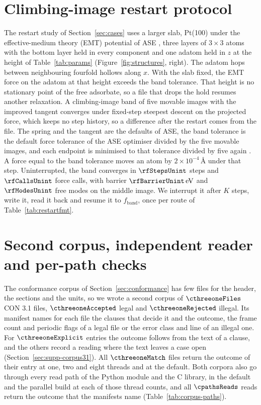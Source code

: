 \section{Climbing-image restart protocol}\label{sec:supp-protocol}
The restart study of Section~\ref{sec:cases}
uses a larger slab, Pt(100) under the effective-medium theory (EMT)
potential of ASE \cite{jacobsenSemiempiricalEffectiveMedium1996}, three
layers of \(3\times3\) atoms with the bottom layer held in every
component and one adatom held in \(z\) at the height of
Table~\ref{tab:params} (Figure~\ref{fig:structures}, right).
The adatom hops between neighbouring fourfold hollows along \(x\).
With the slab fixed, the EMT force on the adatom at that height exceeds
the band tolerance.
That height is no stationary point of the free adsorbate, so a file that
drops the hold resumes another relaxation.
A climbing-image band of five movable images with the improved tangent
\cite{henkelmanClimbingImageNudged2000,henkelmanImprovedTangentEstimate2000}
converges under fixed-step steepest descent on the projected force,
which keeps no step history, so a difference after the restart comes
from the file.
The spring and the tangent are the defaults of ASE, the band tolerance
is the default force tolerance of the ASE optimiser divided by the five
movable images, and each endpoint is minimised to that tolerance divided
by five again \cite{larsenAtomicSimulationEnvironmenta2017}.
A force equal to the band tolerance moves an atom by
\(2\times 10^{-4}\,\text{\AA}\) under that step.
Uninterrupted, the band converges in \(\rfStepsUnint\) steps and
\(\rfCallsUnint\) force calls, with barrier
\(\rfBarrierUnint\,\mathrm{eV}\) and \(\rfModesUnint\) free modes on the
middle image.
We interrupt it after \(K\) steps, write it, read it back and resume it
to \(f_{\mathrm{band}}\), once per route of Table~\ref{tab:restartfmt}.

\section{Second corpus, independent reader and per-path checks}\label{sec:supp-corpora}
The conformance corpus of Section~\ref{sec:conformance} has few files for the header, the sections and the units, so
we wrote a second corpus of \(\cthreeoneFiles\) CON 3.1 files,
\(\cthreeoneAccepted\) legal and \(\cthreeoneRejected\) illegal.
Its manifest names for each file the clauses that decide it and the
outcome, the frame count and periodic flags of a legal file or the error
class and line of an illegal one.
For \(\cthreeoneExplicit\) entries the outcome follows from the text of
a clause, and the others record a reading where the text leaves a case
open (Section~\ref*{sec:supp-corpus31}).
All \(\cthreeoneMatch\) files return the outcome of their entry at one,
two and eight threads and at the default.
Both corpora also go through every read path of the Python module and
the C library, in the default and the parallel build at each of those
thread counts, and all \(\cpathsReads\) reads return the outcome that
the manifests name (Table~\ref*{tab:corpus-paths}).

